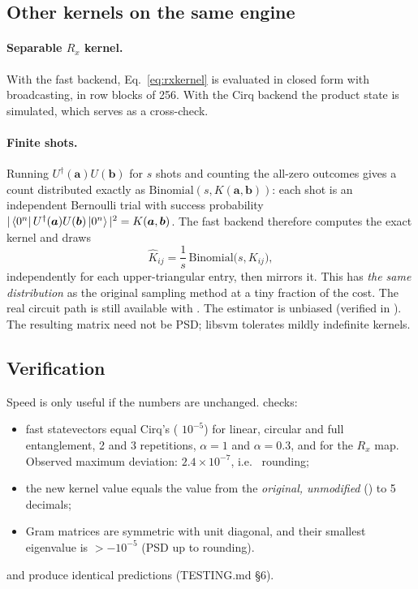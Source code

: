 \subsection{Other kernels on the same engine}
\paragraph{Separable $R_x$ kernel.} With the fast backend, Eq.~\eqref{eq:rxkernel} is evaluated
in closed form with broadcasting, in row blocks of 256. With the Cirq backend the product state
is simulated, which serves as a cross-check.

\paragraph{Finite shots.} Running $U^\dagger(\bm a)U(\bm b)$ for $s$ shots and counting the
all-zero outcomes gives a count distributed exactly as $\text{Binomial}(s, K(\bm a,\bm b))$: each
shot is an independent Bernoulli trial with success probability $|\left\langle0^n\right|U^\dagger(\bm a)U(\bm b)\left|0^n\right\rangle|^2=K(\bm a,\bm b)$.
The fast backend therefore computes the exact kernel and draws
\begin{equation}
\hat K_{ij}=\frac1s\,\text{Binomial}\big(s,K_{ij}\big),
\end{equation}
independently for each upper-triangular entry, then mirrors it. This has \emph{the same
distribution} as the original sampling method at a tiny fraction of the cost. The real circuit
path is still available with . The estimator is unbiased
(verified in ). The resulting matrix need not be PSD;
libsvm tolerates mildly indefinite kernels.

\subsection{Verification}
\label{sec:verify}
Speed is only useful if the numbers are unchanged.  checks:
\begin{itemize}
\item fast statevectors equal Cirq's ( $10^{-5}$) for linear, circular and full
      entanglement, 2 and 3 repetitions, $\alpha=1$ and $\alpha=0.3$, and for the $R_x$ map.
      Observed maximum deviation: $2.4\times10^{-7}$, i.e.\  rounding;
\item the new kernel value equals the value from the \emph{original, unmodified}
       () to 5 decimals;
\item Gram matrices are symmetric with unit diagonal, and their smallest eigenvalue is
      $>-10^{-5}$ (PSD up to rounding).
\end{itemize}
 and  produce identical predictions
(TESTING.md \S6).

